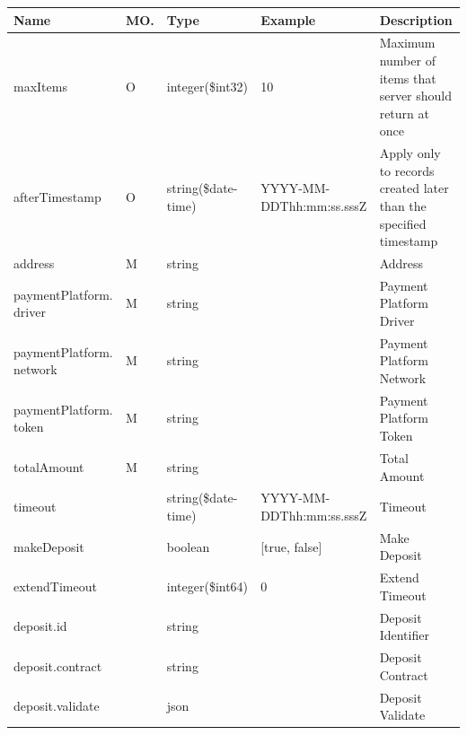 \begin{enumerate}
\begin{enumerate}
\begin{tcolorbox}[boxrule=0pt, frame empty]
\begin{verbatim}
\end{verbatim}
\end{tcolorbox}

\begin{table}[H]
\footnotesize

\begin{center}
\begin{tabular}{|p{3cm}|l|p{3cm}|p{3cm}|p{4cm}|} 
\hline
\rowcolor{lightgray}	Name	& MO.	& Type	& Example & 	Description \\
\hline

maxItems			& O	& 	integer(\$int32)	&	10							&	Maximum number of items that server should return at once \\ 
\hline

afterTimestamp		& O &	string(\$date-time)	&	YYYY-MM-DDThh:mm:ss.sssZ	&	Apply only to records created later than the specified timestamp \\
\hline

address						& M	&	string				&								&	Address	 \\
\hline   
  
paymentPlatform. driver		& M	&	string				&								&	Payment Platform Driver \\
\hline   

paymentPlatform. network	& M	&	string				&								&	Payment Platform Network \\
\hline   
  
paymentPlatform. token		& M	&	string				&								&	Payment Platform Token \\
\hline
     
totalAmount					& M	&	string				&								&	Total Amount \\
\hline

timeout						& 	& 	string(\$date-time)	&	YYYY-MM-DDThh:mm:ss.sssZ	&	Timeout \\ 
\hline

makeDeposit					& 	& 	boolean				&	[true, false]				&	Make Deposit \\ 
\hline

extendTimeout				& 	& 	integer(\$int64)	&	0							&	Extend Timeout \\ 
\hline

deposit.id					&   & 	string				&								&	Deposit Identifier \\
\hline

deposit.contract			&   &	string				&								&	Deposit Contract \\
\hline

deposit.validate			&   &	json				&								&	Deposit Validate \\
\hline


\end{tabular}
\end{center}
\end{table}
\end{enumerate}
\end{enumerate}
